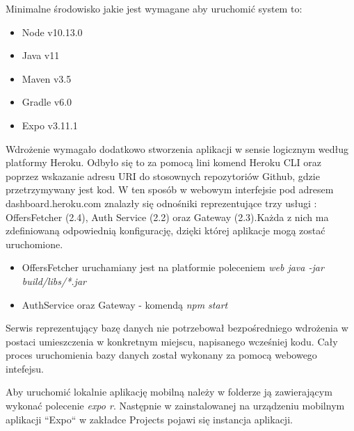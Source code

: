 \newpage
Minimalne środowisko jakie jest wymagane aby uruchomić system to:
\begin{itemize}
	\item Node v10.13.0
	\item Java v11
	\item Maven v3.5
	\item Gradle v6.0
	\item Expo v3.11.1
\end{itemize}

Wdrożenie wymagało dodatkowo stworzenia aplikacji w sensie logicznym według platformy Heroku. Odbyło się to za pomocą lini komend Heroku CLI oraz poprzez wskazanie adresu URI do stosownych repozytoriów Github, gdzie przetrzymywany jest kod.
W ten sposób w webowym interfejsie pod adresem dashboard.heroku.com znalazły się odnośniki reprezentujące trzy usługi : OffersFetcher (2.4), Auth Service (2.2) oraz Gateway (2.3).\newline Każda z nich ma zdefiniowaną odpowiednią konfigurację, dzięki której aplikacje mogą zostać uruchomione.
\begin{itemize}
	\item {OffersFetcher uruchamiany jest na platformie poleceniem \textit{web java -jar build/libs/*.jar}}
	\item {AuthService oraz Gateway - komendą \textit{npm start}}
\end{itemize}

Serwis reprezentujący bazę danych nie potrzebował bezpośredniego wdrożenia w postaci umieszczenia w konkretnym miejscu, napisanego wcześniej kodu. Cały proces uruchomienia bazy danych został wykonany za pomocą webowego intefejsu.

Aby uruchomić lokalnie aplikację mobilną należy w folderze ją zawierającym wykonać polecenie \textit{expo r}. Następnie w zainstalowanej na urządzeniu mobilnym aplikacji ``Expo`` w zakładce Projects pojawi się instancja aplikacji.

